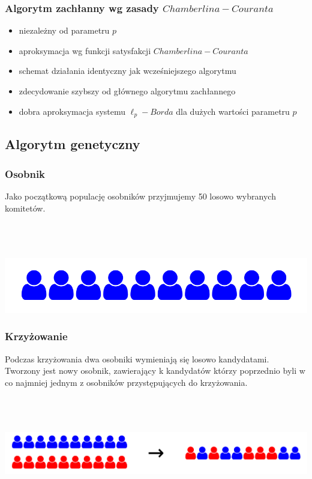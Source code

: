 \documentclass{beamer}
\begin{document}
\begin{frame}
\frametitle{Algorytm zachłanny wg zasady $Chamberlina-Couranta$}
\begin{itemize}
\item niezależny od parametru $p$
\item aproksymacja wg funkcji satysfakcji $Chamberlina-Couranta$
\item schemat działania identyczny jak wcześniejszego algorytmu
\item zdecydowanie szybszy od głównego algorytmu zachłannego
\item dobra aproksymacja systemu $\ell_p-Borda$ dla dużych wartości parametru $p$   
\end{itemize}

\end{frame}


\subsection{Algorytm genetyczny}

\begin{frame}
\frametitle{Osobnik}
Jako początkową populację osobników przyjmujemy 50 losowo wybranych komitetów.

~ \\ ~ \\ ~ \\

\includegraphics[width=0.8\paperwidth]{pics/committee.png}


\end{frame}



\begin{frame}
\frametitle{Krzyżowanie}
Podczas krzyżowania dwa osobniki wymieniają się losowo kandydatami. Tworzony jest nowy osobnik, zawierający k kandydatów którzy poprzednio byli w co najmniej jednym z osobników przystępujących do krzyżowania.

~ \\ ~ \\ ~ \\

\includegraphics[width=0.8\paperwidth]{pics/crossing.png}

\end{frame}
\end{document}
